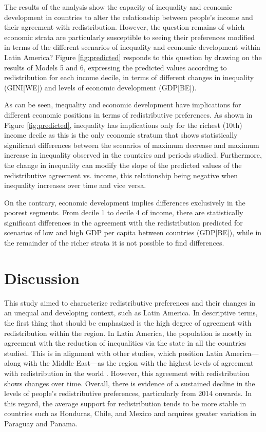\documentclass[utf8]{frontiersSCNS} %
\begin{document}
The results of the analysis show the capacity of inequality and economic development in countries to alter the relationship between people’s income and their agreement with redistribution. However, the question remains of which economic strata are particularly susceptible to seeing their preferences modified in terms of the different scenarios of inequality and economic development within Latin America? Figure \ref{fig:predicted} responds to this question by drawing on the results of Models 5 and 6, expressing the predicted values according to redistribution for each income decile, in terms of different changes in inequality (GINI[WE]) and levels of economic development (GDP[BE]).

As can be seen, inequality and economic development have implications for different economic positions in terms of redistributive preferences. As shown in Figure \ref{fig:predicted}, inequality has implications only for the richest (10th) income decile as this is the only economic stratum that shows statistically significant differences between the scenarios of maximum decrease and maximum increase in inequality observed in the countries and periods studied.  Furthermore, the change in inequality can modify the slope of the predicted values of the redistributive agreement vs. income, this relationship being negative when inequality increases over time and vice versa.

On the contrary, economic development implies differences exclusively in the poorest segments. From decile 1 to decile 4 of income, there are statistically significant differences in the agreement with the redistribution predicted for scenarios of low and high GDP per capita  between countries (GDP[BE]), while in the remainder of the richer strata it is not possible to find differences.

\section{Discussion}

This study aimed to characterize redistributive preferences and their changes in an unequal and developing context, such as Latin America. In descriptive terms, the first thing that should be emphasized is the high degree of agreement with redistribution within the region. In Latin America, the population is mostly in agreement with the reduction of inequalities via the state in all the countries studied. This is in alignment with other studies, which position Latin America—along with the Middle East—as the region with the highest levels of agreement with redistribution in the world \parencite{DionEconomicDevelopmentIncome2010}. However, this agreement with redistribution shows changes over time. Overall, there is evidence of a sustained decline in the levels of people’s redistributive preferences, particularly from 2014 onwards. In this regard, the average support for redistribution tends to be more stable in countries such as Honduras, Chile, and Mexico and acquires greater variation in Paraguay and Panama.
\end{document}
